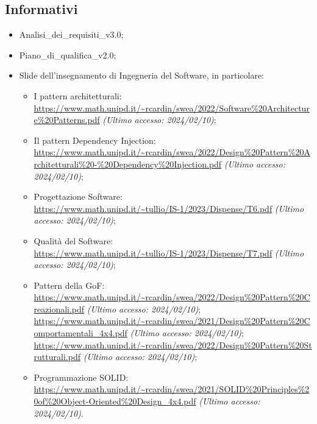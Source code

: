 \subsection{Informativi}
\begin{itemize}
    \item Analisi\_dei\_requisiti\_v3.0;
    \item Piano\_di\_qualifica\_v2.0;
    \item Slide dell’insegnamento di Ingegneria del Software, in particolare:
        \begin{itemize}
            \item I pattern architetturali: \\ \url{https://www.math.unipd.it/~rcardin/swea/2022/Software%20Architecture%20Patterns.pdf} \textit{(Ultimo accesso: 2024/02/10)};
            \item Il pattern Dependency Injection:\\ \url{https://www.math.unipd.it/~rcardin/swea/2022/Design%20Pattern%20Architetturali%20-%20Dependency%20Injection.pdf} \textit{(Ultimo accesso: 2024/02/10)};
            \item Progettazione Software:\\ \url{https://www.math.unipd.it/~tullio/IS-1/2023/Dispense/T6.pdf} \textit{(Ultimo accesso: 2024/02/10)};
            \item Qualità del Software:\\ \url{https://www.math.unipd.it/~tullio/IS-1/2023/Dispense/T7.pdf} \textit{(Ultimo accesso: 2024/02/10)};
            \item Pattern della GoF:\\ \url{https://www.math.unipd.it/~rcardin/swea/2022/Design%20Pattern%20Creazionali.pdf} \textit{(Ultimo accesso: 2024/02/10)};\\
            \url{https://www.math.unipd.it/~rcardin/swea/2021/Design%20Pattern%20Comportamentali_4x4.pdf} \textit{(Ultimo accesso: 2024/02/10)};\\
            \url{https://www.math.unipd.it/~rcardin/swea/2022/Design%20Pattern%20Strutturali.pdf} \textit{(Ultimo accesso: 2024/02/10)};
            \item Programmazione SOLID:\\ \url{https://www.math.unipd.it/~rcardin/swea/2021/SOLID%20Principles%20of%20Object-Oriented%20Design_4x4.pdf} \textit{(Ultimo accesso: 2024/02/10)}.
        \end{itemize}
\end{itemize}
